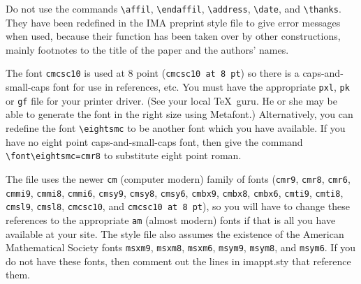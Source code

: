 Do not use the commands
\verb"\affil", \verb"\endaffil", \verb"\address", \verb"\date", and
\verb"\thanks".  They have been redefined in the IMA preprint style file
to give error messages when used, because
their function has been taken over by other constructions, mainly footnotes
to the title of the paper and the authors' names.

 The font \verb"cmcsc10" is
used at 8 point (\verb"cmcsc10 at 8 pt") so there is a
caps-and-small-caps font for use in references, etc.  You must
have the appropriate \verb"pxl", \verb"pk" or \verb"gf" file for
your printer driver. (See your local \TeX\ guru.  He or she may
be able to generate the font in the right size using Metafont.) 
Alternatively, you can redefine the font \verb"\eightsmc"
to be another font which you have available.
If you have no eight point caps-and-small-caps font, then
give the command \verb"\font\eightsmc=cmr8" to substitute
eight point roman.

The file uses the newer \verb"cm" (computer modern) family of fonts
(\verb"cmr9", \verb"cmr8", \verb"cmr6", \verb"cmmi9", \verb"cmmi8",
\verb"cmmi6", \verb"cmsy9", \verb"cmsy8", \verb"cmsy6", \verb"cmbx9",
\verb"cmbx8", \verb"cmbx6", \verb"cmti9", \verb"cmti8", \verb"cmsl9",
\verb"cmsl8", \verb"cmcsc10", and \verb"cmcsc10 at 8 pt"), so you will
have to change these references to the appropriate \verb"am" (almost
modern) fonts if that is all you have available at your site.  The
style file also assumes the existence of the American Mathematical
Society fonts \verb"msxm9", \verb"msxm8", \verb"msxm6", \verb"msym9",
\verb"msym8", and \verb"msym6".  If you do not have these fonts, then
comment out the lines in imappt.sty that reference them.

\bye
